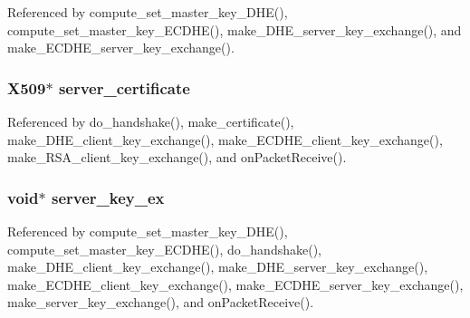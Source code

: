 Referenced by compute\+\_\+set\+\_\+master\+\_\+key\+\_\+\+D\+H\+E(), compute\+\_\+set\+\_\+master\+\_\+key\+\_\+\+E\+C\+D\+H\+E(), make\+\_\+\+D\+H\+E\+\_\+server\+\_\+key\+\_\+exchange(), and make\+\_\+\+E\+C\+D\+H\+E\+\_\+server\+\_\+key\+\_\+exchange().

\subsubsection[{\texorpdfstring{server\+\_\+certificate}{server_certificate}}]{\setlength{\rightskip}{0pt plus 5cm}X509$\ast$ server\+\_\+certificate}\hypertarget{struct_t_l_s__parameters__t_a832ae425d6bb6330e1e5e825ab85ac31}{}\label{struct_t_l_s__parameters__t_a832ae425d6bb6330e1e5e825ab85ac31}


Referenced by do\+\_\+handshake(), make\+\_\+certificate(), make\+\_\+\+D\+H\+E\+\_\+client\+\_\+key\+\_\+exchange(), make\+\_\+\+E\+C\+D\+H\+E\+\_\+client\+\_\+key\+\_\+exchange(), make\+\_\+\+R\+S\+A\+\_\+client\+\_\+key\+\_\+exchange(), and on\+Packet\+Receive().

\subsubsection[{\texorpdfstring{server\+\_\+key\+\_\+ex}{server_key_ex}}]{\setlength{\rightskip}{0pt plus 5cm}void$\ast$ server\+\_\+key\+\_\+ex}\hypertarget{struct_t_l_s__parameters__t_a8ca08ac851747e17048fddf461c65ec4}{}\label{struct_t_l_s__parameters__t_a8ca08ac851747e17048fddf461c65ec4}


Referenced by compute\+\_\+set\+\_\+master\+\_\+key\+\_\+\+D\+H\+E(), compute\+\_\+set\+\_\+master\+\_\+key\+\_\+\+E\+C\+D\+H\+E(), do\+\_\+handshake(), make\+\_\+\+D\+H\+E\+\_\+client\+\_\+key\+\_\+exchange(), make\+\_\+\+D\+H\+E\+\_\+server\+\_\+key\+\_\+exchange(), make\+\_\+\+E\+C\+D\+H\+E\+\_\+client\+\_\+key\+\_\+exchange(), make\+\_\+\+E\+C\+D\+H\+E\+\_\+server\+\_\+key\+\_\+exchange(), make\+\_\+server\+\_\+key\+\_\+exchange(), and on\+Packet\+Receive().

